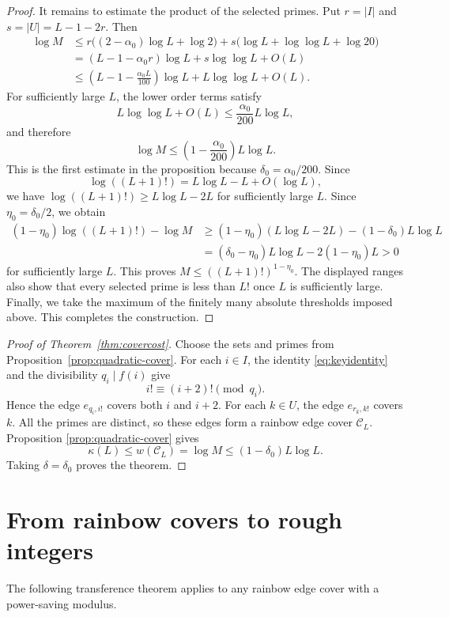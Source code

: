 \documentclass[11pt]{amsart}
\theoremstyle{definition}
\theoremstyle{remark}
\begin{document}
\begin{proof}
It remains to estimate the product of the selected primes.  Put $r=|I|$ and
$s=|U|=L-1-2r$.  Then
\begin{align*}
\log M
&\leq
r\bigl((2-\alpha_0)\log L+\log2\bigr)
+s\bigl(\log L+\log\log L+\log20\bigr)\\
&=(L-1-\alpha_0r)\log L+s\log\log L+O(L)\\
&\leq
\left(L-1-\frac{\alpha_0L}{100}\right)\log L
+L\log\log L+O(L).
\end{align*}
For sufficiently large $L$, the lower order terms satisfy
\[
L\log\log L+O(L)
\leq\frac{\alpha_0}{200}L\log L,
\]
and therefore
\[
\log M
\leq
\left(1-\frac{\alpha_0}{200}\right)L\log L.
\]
This is the first estimate in the proposition because
$\delta_0=\alpha_0/200$.
Since
\[
\log((L+1)!)=L\log L-L+O(\log L),
\]
we have $\log((L+1)!)\geq L\log L-2L$ for sufficiently large $L$.  Since
$\eta_0=\delta_0/2$, we obtain
\begin{align*}
(1-\eta_0)\log((L+1)!)-\log M
&\geq
(1-\eta_0)(L\log L-2L)-(1-\delta_0)L\log L\\
&=(\delta_0-\eta_0)L\log L-2(1-\eta_0)L>0
\end{align*}
for sufficiently large $L$.  This proves
$M\leq((L+1)!)^{1-\eta_0}$.  The displayed ranges also show that every
selected prime is less than $L!$ once $L$ is sufficiently large.  Finally,
we take the maximum of the finitely many absolute thresholds imposed above.
This completes the construction.
\end{proof}

\begin{proof}[Proof of Theorem~\ref{thm:covercost}]
Choose the sets and primes from Proposition~\ref{prop:quadratic-cover}.  For
each $i\in I$, the identity \eqref{eq:keyidentity} and the divisibility
$q_i\mid f(i)$ give
\[
i!\equiv(i+2)!\pmod{q_i}.
\]
Hence the edge $e_{q_i,i!}$ covers both $i$ and $i+2$.  For each $k\in U$,
the edge $e_{r_k,k!}$ covers $k$.  All the primes are distinct, so these
edges form a rainbow edge cover $\mathcal C_L$.  Proposition
\ref{prop:quadratic-cover} gives
\[
\kappa(L)\leq w(\mathcal C_L)
=\log M\leq(1-\delta_0)L\log L.
\]
Taking $\delta=\delta_0$ proves the theorem.
\end{proof}

\section{From rainbow covers to rough integers}

The following transference theorem applies to any rainbow edge cover with a
power-saving modulus.
\end{document}
